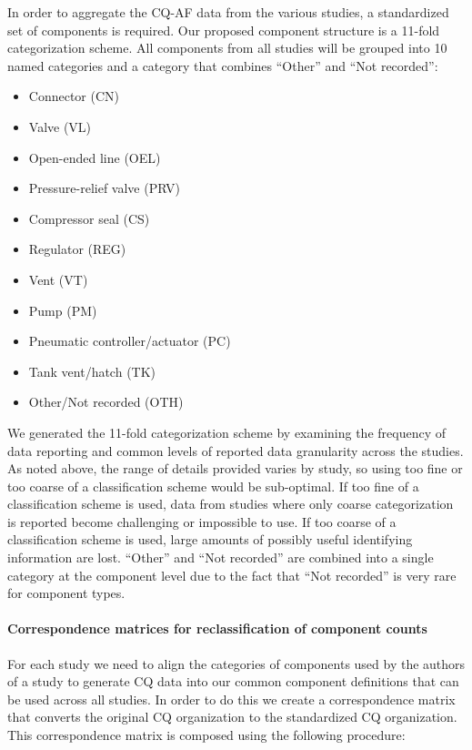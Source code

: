 \documentclass[11pt]{report}
\begin{document}
{{{{In order to aggregate the CQ-AF data from the various studies, a standardized set of components is required. Our proposed component structure is a 11-fold categorization scheme. All components from all studies will be grouped into 10 named categories and a category that combines ``Other'' and ``Not recorded'':
\begin{itemize}
\item Connector (CN)
\item Valve (VL)
\item Open-ended line (OEL)
\item Pressure-relief valve (PRV)
\item Compressor seal (CS)
\item Regulator (REG)
\item Vent (VT)
\item Pump (PM)
\item Pneumatic controller/actuator (PC)
\item Tank vent/hatch (TK)
\item Other/Not recorded (OTH)
\end{itemize}

We generated the 11-fold categorization scheme by examining the frequency of data reporting and common levels of reported data granularity across the studies. As noted above, the range of details provided varies by study, so using too fine or too coarse of a classification scheme would be sub-optimal. If too fine of a classification scheme is used, data from studies where only coarse categorization is reported become challenging or impossible to use. If too coarse of a classification scheme is used, large amounts of possibly useful identifying information are lost. ``Other'' and ``Not recorded'' are combined into a single category at the component level due to the fact that ``Not recorded'' is very rare for component types.

\paragraph{Correspondence matrices for reclassification of component counts}

For each study we need to align the categories of components used by the authors of a study to generate CQ data into our common component definitions that can be used across all studies. In order to do this we create a correspondence matrix that converts the original CQ organization to the standardized CQ organization. This correspondence matrix is composed using the following procedure:

}}}}
\end{document}
